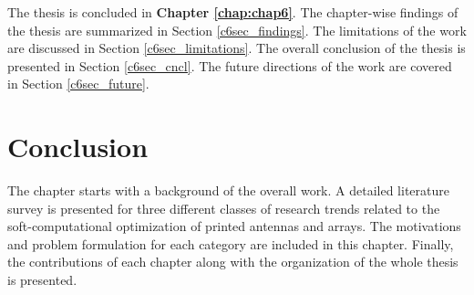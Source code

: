 The thesis is concluded in \textbf{Chapter \ref{chap:chap6}}. The chapter-wise findings of the thesis are summarized in Section \ref{c6sec_findings}. The limitations of the work are discussed in Section \ref{c6sec_limitations}. The overall conclusion of the thesis is presented in Section \ref{c6sec_cncl}. The future directions of the work are covered in Section \ref{c6sec_future}.
\section{Conclusion} \label{c1sec_concl}
The chapter starts with a background of the overall work. A detailed literature survey is presented for three different classes of research trends related to the soft-computational optimization of printed antennas and arrays. The motivations and problem formulation for each category are included in this chapter. Finally, the contributions of each chapter along with the organization of the whole thesis is presented.
